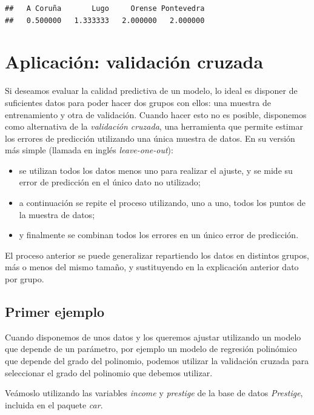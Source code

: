 \documentclass[
]{book}
\theoremstyle{break}
\theoremstyle{nonumberplain}
\begin{document}
\begin{verbatim}
##   A Coruña       Lugo     Orense Pontevedra 
##   0.500000   1.333333   2.000000   2.000000
\end{verbatim}

\hypertarget{aplicaciuxf3n-validaciuxf3n-cruzada}{%
\section{Aplicación: validación cruzada}\label{aplicaciuxf3n-validaciuxf3n-cruzada}}

Si deseamos evaluar la calidad predictiva de un modelo, lo ideal es disponer de
suficientes datos para poder hacer dos grupos con ellos: una muestra de entrenamiento
y otra de validación. Cuando hacer esto no es posible, disponemos como alternativa
de la \emph{validación cruzada}, una herramienta que permite estimar los errores de
predicción utilizando una única muestra de datos. En su versión más simple (llamada
en inglés \emph{leave-one-out}):

\begin{itemize}
\item
  se utilizan todos los datos menos uno para realizar el ajuste, y se mide su error de
  predicción en el único dato no utilizado;
\item
  a continuación se repite el proceso
  utilizando, uno a uno, todos los puntos de la muestra de datos;
\item
  y finalmente se combinan todos los errores en un único error de predicción.
\end{itemize}

El proceso anterior se puede generalizar repartiendo los datos en distintos grupos,
más o menos del mismo tamaño, y sustituyendo en la explicación anterior dato por grupo.

\hypertarget{primer-ejemplo}{%
\subsection{Primer ejemplo}\label{primer-ejemplo}}

Cuando disponemos de unos datos y los queremos ajustar utilizando un modelo que
depende de un parámetro, por ejemplo un modelo
de regresión polinómico que depende del grado del polinomio, podemos utilizar
la validación cruzada para seleccionar el grado del polinomio que debemos utilizar.

Veámoslo utilizando las variables \emph{income} y \emph{prestige} de la
base de datos \emph{Prestige}, incluida en el paquete \emph{car}.
\end{document}
